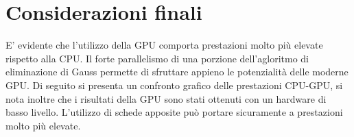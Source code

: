 \documentclass{article}
\begin{document}
\section{Considerazioni finali}
E' evidente che l'utilizzo della GPU comporta prestazioni molto più elevate rispetto alla CPU. Il forte parallelismo di una porzione dell'agloritmo di eliminazione di Gauss permette di sfruttare appieno le potenzialità delle moderne GPU. Di seguito si presenta un confronto grafico delle prestazioni CPU-GPU, si nota inoltre che i risultati della GPU sono stati ottenuti con un hardware di basso livello. L'utilizzo di schede apposite può portare sicuramente a prestazioni molto più elevate.

\end{document}
